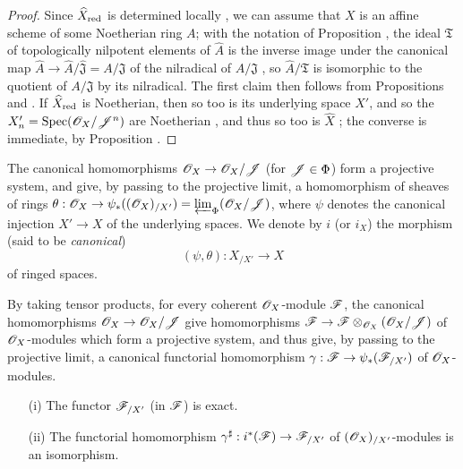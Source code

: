 \begin{proof}
Since $\widehat{X}_{\mathrm{red}}$ is determined locally , we can assume that $X$ is an affine scheme of some Noetherian ring $A$; with the notation of Proposition , the ideal $\mathfrak{T}$ of topologically nilpotent elements of $\widehat{A}$ is the inverse image under the canonical map $\widehat{A}\to\widehat{A}/\widehat{\mathfrak{J}}=A/\mathfrak{J}$ of the nilradical of $A/\mathfrak{J}$ , so $\widehat{A}/\mathfrak{T}$ is isomorphic to the quotient of $A/\mathfrak{J}$ by its nilradical.
The first claim then follows from Propositions  and .
If $\widehat{X}_{\mathrm{red}}$ is Noetherian, then so too is its underlying space $X'$, and so the $X_n'=\operatorname{Spec}(\mathscr{O}_X/\mathscr{J}^n)$ are Noetherian , and thus so too is $\widehat{X}$ ; the converse is immediate, by Proposition .
\end{proof}

\begin{env}[10.8.7]
\label{I.10.8.7}
The canonical homomorphisms $\sh{O}_X\to\sh{O}_X/\sh{J}$ (for $\mathscr{J}\in\Phi$) form a projective system, and give, by passing to the projective limit, a homomorphism of sheaves of rings $\theta:\sh{O}_X\to\psi_*((\sh{O}_X)_{/X'})=\varprojlim_\Phi(\sh{O}_X/\sh{J})$, where $\psi$ denotes the canonical injection $X'\to X$ of the underlying spaces.
We denote by $i$ (or $i_X$) the morphism (said to be \emph{canonical})
\[
  (\psi,\theta):X_{/X'}\to X
\]
of ringed spaces.

By taking tensor products, for every coherent $\mathscr{O}_X$-module $\mathscr{F}$, the canonical homomorphisms $\sh{O}_X\to\sh{O}_X/\sh{J}$ give homomorphisms $\sh{F}\to\sh{F}\otimes_{\sh{O}_X}(\sh{O}_X/\sh{J})$ of $\mathscr{O}_X$-modules which form a projective system, and thus give, by passing to the projective limit, a canonical functorial homomorphism $\gamma:\sh{F}\to\psi_*(\sh{F}_{/X'})$ of $\mathscr{O}_X$-modules.
\end{env}

\begin{proposition}[10.8.8]
\label{I.10.8.8}
\medskip\noindent
\begin{enumerate}
  \item[\rm{(i)}] The functor $\mathscr{F}_{/X'}$ (in $\mathscr{F}$) is exact.
  \item[\rm{(ii)}] The functorial homomorphism $\gamma^\sharp:i^*(\sh{F})\to\sh{F}_{/X'}$ of $(\mathscr{O}_X)_{/X'}$-modules is an isomorphism.
\end{enumerate}
\end{proposition}

